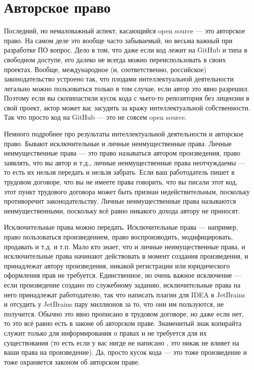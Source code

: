 \documentclass[a5paper]{article}
\begin{document}
\section{Авторское право}

Последний, но немаловажный аспект, касающийся open source --- это авторское право. На самом деле это вообще часто забываемый, но весьма важный при разработке ПО вопрос. Дело в том, что даже если код лежит на GitHub и типа в свободном доступе, его далеко не всегда можно переиспользовать в своих проектах. Вообще, международное (и, соответственно, российское) законодательство устроено так, что плодами интеллектуальной деятельности легально можно пользоваться только в том случае, если автор это явно разрешил. Поэтому если вы скопипастили кусок кода с чьего-то репозитория без лицензии в свой проект, актор может вас засудить за кражу интеллектуальной собственности. Так что просто код на GitHub --- это не совсем open source.

Немного подробнее про результаты интеллектуальной деятельности и авторское право. Бывают исключительные и личные неимущественные права. Личные неимущественные права --- это право называться автором произведения, право заявлять, что вы автор и т.д., личные неимущественные права неотчуждаемы --- то есть их нельзя передать и нельзя забрать. Если ваш работодатель пишет в трудовом договоре, что вы не имеете права говорить, что вы писали этот код, этот пункт трудового договора может быть признан недействительным, поскольку противоречит законодательству. Личные неимущественные права называются неимущественными, поскольку всё равно никакого дохода автору не приносят.

Исключительные права можно передать. Исключительные права --- например, право пользоваться произведением, право воспроизводить, модифицировать, продавать и т.д. и т.п. Мало кто знает, что и личные неимущественные права, и исключительные права начинают действовать в момент создания произведения, и принадлежат автору произведения, никакой регистрации или юридического оформления прав не требуется. Единственное, но очень важное исключение --- если произведение создано по служебному заданию, исключительные права на него принадлежат работодателю, так что написать плагин для IDEA в JetBrains и отсудить у JetBrains пару миллионов за то, что они им пользуются, не получится. Обычно это явно прописано в трудовом договоре, но даже если нет, то это всё равно есть в законе об авторском праве. Знаменитый знак копирайта \textcopyright служит только для информирования о правах и не требуется для их существования (то есть если у вас нигде не написано \textcopyright, это никак не влияет на ваши права на произведение). Да, просто кусок кода --- это тоже произведение и тоже охраняется законом об авторском праве.
\end{document}

